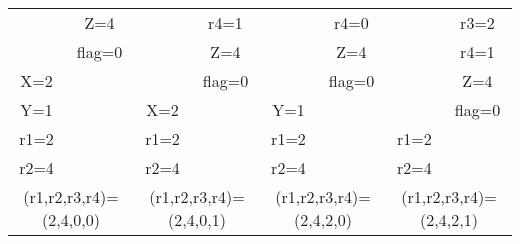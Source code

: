 \documentclass[a4paper,12pt]{article}
\begin{document}
\begin{table}[H]
\begin{tabular}{|c|c| |c|c| |c|c| |c|c|}
            &   Z=4      &             &   r4=1       &          &     r4=0    &            &      r3=2     \\
            & flag=0     &             &    Z=4       &          &      Z=4    &            &      r4=1     \\
  X=2       &            &             &  flag=0      &          &    flag=0   &            &       Z=4     \\
  Y=1       &            &    X=2      &              &   Y=1    &             &            &     flag=0    \\
  r1=2      &            &    r1=2     &              &   r1=2   &             &      r1=2  &               \\
  r2=4      &            &    r2=4     &              &   r2=4   &             &      r2=4  &               \\
        \hline
        \multicolumn{2}{|c||}{(r1,r2,r3,r4)=(2,4,0,0)} &   \multicolumn{2}{|c||}{(r1,r2,r3,r4)=(2,4,0,1)} &
        \multicolumn{2}{|c||}{(r1,r2,r3,r4)=(2,4,2,0)} &   \multicolumn{2}{|c|}{(r1,r2,r3,r4)=(2,4,2,1)} \\
        \hline

    \end{tabular}
\end{table}
\end{document}
